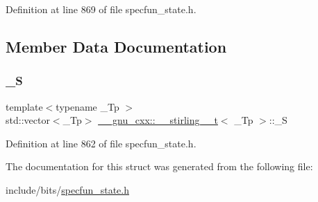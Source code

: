 Definition at line 869 of file specfun\+\_\+state.\+h.



\subsection{Member Data Documentation}
\mbox{\label{struct____gnu__cxx_1_1____stirling__2__t_aaae5f39d3a7053cac92eb0541440817f}} 
\subsubsection{\texorpdfstring{\+\_\+S}{\_S}}
{\footnotesize\ttfamily template$<$typename \+\_\+\+Tp $>$ \\
std\+::vector$<$\+\_\+\+Tp$>$ \hyperlink{struct____gnu__cxx_1_1____stirling__2__t}{\+\_\+\+\_\+gnu\+\_\+cxx\+::\+\_\+\+\_\+stirling\+\_\+\_\+t}$<$ \+\_\+\+Tp $>$\+::\+\_\+S}



Definition at line 862 of file specfun\+\_\+state.\+h.



The documentation for this struct was generated from the following file\+:\begin{DoxyCompactItemize}
\item 
include/bits/\hyperlink{specfun__state_8h}{specfun\+\_\+state.\+h}\end{DoxyCompactItemize}
